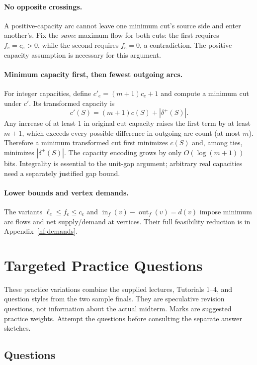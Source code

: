 \documentclass[10pt]{article}
\theoremstyle{definition}
\begin{document}
\paragraph{No opposite crossings.}
A positive-capacity arc cannot leave one minimum cut's source side and enter
another's. Fix the \emph{same} maximum flow for both cuts: the first requires
$f_e=c_e>0$, while the second requires $f_e=0$, a contradiction.
The positive-capacity assumption is necessary for this argument.

\paragraph{Minimum capacity first, then fewest outgoing arcs.}
For integer capacities, define $c'_e=(m+1)c_e+1$ and compute a minimum cut
under $c'$. Its transformed capacity is
\[
 c'(S)=(m+1)c(S)+|\delta^+(S)|.
\]
Any increase of at least 1 in original cut capacity raises the first term
by at least $m+1$, which exceeds every possible difference in outgoing-arc
count (at most $m$). Therefore a minimum transformed cut first minimizes
$c(S)$ and, among ties, minimizes $|\delta^+(S)|$. The capacity encoding grows
by only $O(\log(m+1))$ bits. Integrality is essential to the unit-gap argument;
arbitrary real capacities need a separately justified gap bound.


\paragraph{Lower bounds and vertex demands.}
The variants $\ell_e\le f_e\le c_e$ and
$\operatorname{in}_f(v)-\operatorname{out}_f(v)=d(v)$ impose minimum arc flows
and net supply/demand at vertices. Their full feasibility reduction is in
Appendix~\ref{nf:demands}.


\clearpage\appendix

\section{Targeted Practice Questions}\label{prac:questions}\label{prac:main}
These practice variations combine the supplied lectures, Tutorials 1--4,
and question styles from the two sample finals.  They are speculative
revision questions, not information about the actual midterm.  Marks are
suggested practice weights.  Attempt the questions before consulting the
separate answer sketches.

\subsection{Questions}
\end{document}
